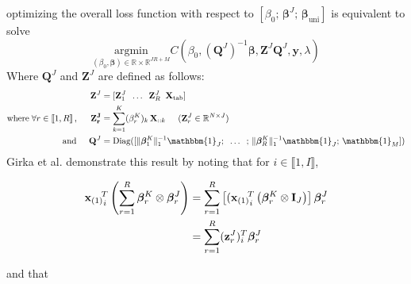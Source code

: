 \documentclass[preprint,12pt]{elsarticle}
\begin{document}
\noindent optimizing the overall loss function with respect to $\left[ \beta_0;\, \bm{\beta}^J ;\, \bm{\beta}_{\text{uni}}  \right]$ is equivalent to solve
\begin{equation}
    \underset{(\beta_0, \bm{\beta}) \in \mathbb{R} \times \mathbb{R}^{JR + M}}{\text{argmin}}  C(\beta_0, (\mathbf{Q}^J)^{-1}\bm{\beta},\mathbf{Z}^J \mathbf{Q}^J, \mathbf{y}, \lambda)
\end{equation}
\noindent Where $\mathbf{Q}^J$ and $\mathbf{Z}^J$ are defined as follows:
\begin{align}
    \mathbf{Z}^J                                                                               & = [\mathbf{Z}_1^J \; \; \hdots \; \; \mathbf{Z}_R^J \; \;  \mathbf{X}_{\text{tab}}]                                                                             \\
    \text{where} \; \forall r \in \llbracket 1, R\rrbracket\, , \hspace{0.5 cm} \mathbf{Z_r^J} & = \sum\limits_{k = 1}^K (\beta_r^K)_k  \, \mathbf{X}_{::k} \hspace{0.5 cm} (\mathbf{Z}_r^J \in \mathbb{R}^{N \times J})                                             \\
    \hspace{7 pt}
    \text{and} \hspace{0.5 cm} \mathbf{Q}^J & = \text{Diag}([\lVert \bm{\beta}_1^K \rVert_1^{-1} \mathbbm{1}_J; \; \; \hdots \; \; ;\, \lVert \bm{\beta}_R^K \rVert_1^{-1} \mathbbm{1}_J ;\,  \mathbbm{1}_M])
\end{align}
\hspace{10 pt}
\noindent Girka et al. \cite{multi_rank_r} demonstrate this result by noting that for $i \in \llbracket 1, I\rrbracket$,

\begin{align}
    {{\mathbf{x}_{(1)}}_i}^{\hspace{-5 pt} T} \left( \sum\limits_{r = 1}^R \bm{\beta}_r^K \otimes \bm{\beta}_r^J \right) & = \sum\limits_{r = 1}^R \left[({{\mathbf{x}_{(1)}}_i}^{\hspace{-5 pt} T}   \left( \bm{\beta}_r^K  \otimes \mathbf{I}_J\right)\right] \bm{\beta}_r^J \\
                                                                                                                         & = \sum\limits_{r = 1}^R (\mathbf{z}_r^J)_i^T \bm{\beta}_r^J
\end{align}

\noindent and that
\end{document}
